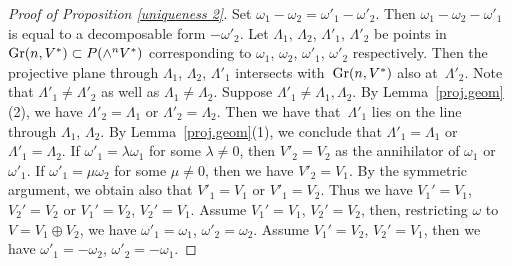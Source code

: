 \documentclass[pdftex]{sigma}
\begin{document}
\begin{proof}[Proof of Proposition \ref{uniqueness 2}]
Set $\omega_1 - \omega_2 = \omega'_1 - \omega'_2$. Then
$\omega_1 - \omega_2 - \omega'_1$ is equal to a decomposable form
$- \omega'_2$.
Let $\Lambda_1$, $\Lambda_2$, $\Lambda'_1$, $\Lambda'_2$ be
points in ${\rm Gr}(n, V^*) \subset P(\wedge^n V^*)$
corresponding to $\omega_1$, $\omega_2$, $\omega'_1$, $\omega'_2$ respectively.
Then the projective plane through $\Lambda_1$, $\Lambda_2$, $\Lambda'_1$
intersects with~${\rm Gr}(n, V^*)$ also at~$\Lambda'_2$.
Note that $\Lambda'_1 \not= \Lambda'_2$ as well as
$\Lambda_1 \not= \Lambda_2$.
Suppose $\Lambda'_1 \not= \Lambda_1, \Lambda_2$.
By Lemma~\ref{proj.geom}(2), we have
$\Lambda'_2 = \Lambda_1$ or $\Lambda'_2 = \Lambda_2$.
Then we have that~$\Lambda'_1$ lies on the line through $\Lambda_1$, $\Lambda_2$.
By Lemma~\ref{proj.geom}(1), we conclude that
$\Lambda'_1 = \Lambda_1$ or $\Lambda'_1 = \Lambda_2$.
If $\omega'_1 = \lambda\omega_1$ for some $\lambda \not= 0$,
then $V'_2 = V_2$ as the annihilator of $\omega_1$ or $\omega'_1$.
If $\omega'_1 = \mu\omega_2$ for some $\mu \not= 0$,
then we have $V'_2 = V_1$.
By the symmetric argument, we obtain also that $V'_1 = V_1$ or $V'_1 = V_2$.
Thus we have $V_1' = V_1$, $V_2' = V_2$ or
$V_1' = V_2$,  $V_2' = V_1$.
Assume $V_1' = V_1$, $V_2' = V_2$, then,
restricting $\omega$ to $V = V_1 \oplus V_2$, we have
$\omega'_1 = \omega_1$, $\omega'_2 = \omega_2$.
Assume $V_1' = V_2$,  $V_2' = V_1$,
then we have $\omega'_1 = -\omega_2$, $\omega'_2 = - \omega_1$.
\end{proof}
\end{document}
